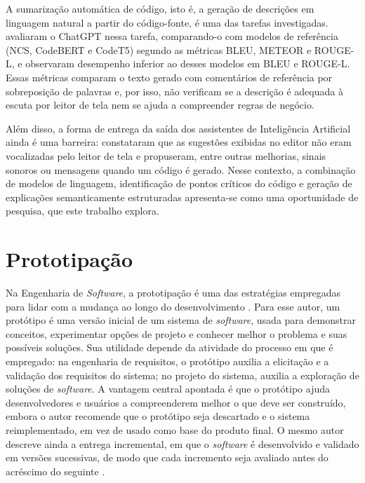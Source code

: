 \documentclass[
    12pt,                   %
    openright,              %
    oneside,                %
    a4paper,                %
    sumario=tradicional,    %
    english,                %
    brazil,                 %
    ]{abntex2}
\begin{document}
A sumarização automática de código, isto é, a geração de descrições em linguagem natural a partir do código-fonte, é uma das tarefas investigadas. \textcite{sun2023chatgptsum} avaliaram o ChatGPT nessa tarefa, comparando-o com modelos de referência (NCS, CodeBERT e CodeT5) segundo as métricas BLEU, METEOR e ROUGE-L, e observaram desempenho inferior ao desses modelos em BLEU e ROUGE-L. Essas métricas comparam o texto gerado com comentários de referência por sobreposição de palavras e, por isso, não verificam se a descrição é adequada à escuta por leitor de tela nem se ajuda a compreender regras de negócio.

Além disso, a forma de entrega da saída dos assistentes de Inteligência Artificial ainda é uma barreira: \textcite{latinoware34224} constataram que as sugestões exibidas no editor não eram vocalizadas pelo leitor de tela e propuseram, entre outras melhorias, sinais sonoros ou mensagens quando um código é gerado. Nesse contexto, a combinação de modelos de linguagem, identificação de pontos críticos do código e geração de explicações semanticamente estruturadas apresenta-se como uma oportunidade de pesquisa, que este trabalho explora.

\section{Prototipação}\label{sec:Prototipacao}

Na Engenharia de \textit{Software}, a prototipação é uma das estratégias empregadas para lidar com a mudança ao longo do desenvolvimento \cite{sommerville2018}. Para esse autor, um protótipo é uma versão inicial de um sistema de \textit{software}, usada para demonstrar conceitos, experimentar opções de projeto e conhecer melhor o problema e suas possíveis soluções. Sua utilidade depende da atividade do processo em que é empregado: na engenharia de requisitos, o protótipo auxilia a elicitação e a validação dos requisitos do sistema; no projeto do sistema, auxilia a exploração de soluções de \textit{software}. A vantagem central apontada é que o protótipo ajuda desenvolvedores e usuários a compreenderem melhor o que deve ser construído, embora o autor recomende que o protótipo seja descartado e o sistema reimplementado, em vez de usado como base do produto final. O mesmo autor descreve ainda a entrega incremental, em que o \textit{software} é desenvolvido e validado em versões sucessivas, de modo que cada incremento seja avaliado antes do acréscimo do seguinte \cite{sommerville2018}.
\end{document}
